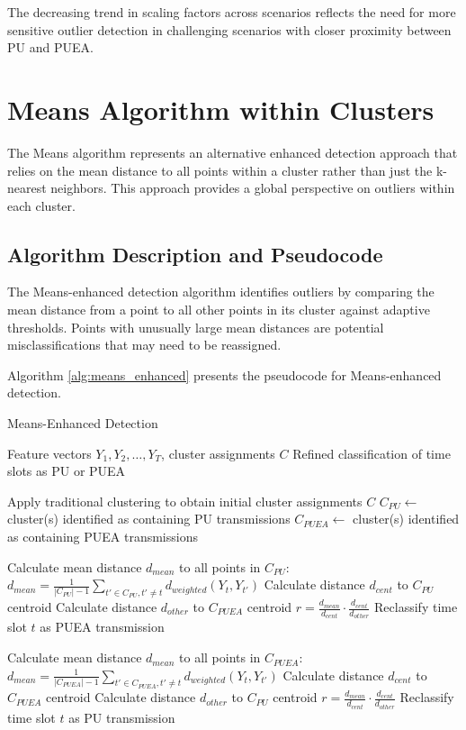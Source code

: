 The decreasing trend in scaling factors across scenarios reflects the need for more sensitive outlier detection in challenging scenarios with closer proximity between PU and PUEA.

\section{Means Algorithm within Clusters}

The Means algorithm represents an alternative enhanced detection approach that relies on the mean distance to all points within a cluster rather than just the k-nearest neighbors. This approach provides a global perspective on outliers within each cluster.

\subsection{Algorithm Description and Pseudocode}

The Means-enhanced detection algorithm identifies outliers by comparing the mean distance from a point to all other points in its cluster against adaptive thresholds. Points with unusually large mean distances are potential misclassifications that may need to be reassigned.

Algorithm \ref{alg:means_enhanced} presents the pseudocode for Means-enhanced detection.

\begin{algorithm}
\caption{Means-Enhanced Detection}
\label{alg:means_enhanced}
\begin{algorithmic}[1]
\Require Feature vectors $Y_1, Y_2, \ldots, Y_T$, cluster assignments $C$
\Ensure Refined classification of time slots as PU or PUEA

\State Apply traditional clustering to obtain initial cluster assignments $C$
\State $C_{PU} \gets$ cluster(s) identified as containing PU transmissions
\State $C_{PUEA} \gets$ cluster(s) identified as containing PUEA transmissions

    \State Calculate mean distance $d_{mean}$ to all points in $C_{PU}$:
    \State $d_{mean} = \frac{1}{|C_{PU}|-1} \sum_{t' \in C_{PU}, t' \neq t} d_{weighted}(Y_t, Y_{t'})$
    \State Calculate distance $d_{cent}$ to $C_{PU}$ centroid
    \State Calculate distance $d_{other}$ to $C_{PUEA}$ centroid
    \State $r = \frac{d_{mean}}{d_{cent}} \cdot \frac{d_{cent}}{d_{other}}$
        \State Reclassify time slot $t$ as PUEA transmission
    \EndIf
\EndFor

    \State Calculate mean distance $d_{mean}$ to all points in $C_{PUEA}$:
    \State $d_{mean} = \frac{1}{|C_{PUEA}|-1} \sum_{t' \in C_{PUEA}, t' \neq t} d_{weighted}(Y_t, Y_{t'})$
    \State Calculate distance $d_{cent}$ to $C_{PUEA}$ centroid
    \State Calculate distance $d_{other}$ to $C_{PU}$ centroid
    \State $r = \frac{d_{mean}}{d_{cent}} \cdot \frac{d_{cent}}{d_{other}}$
        \State Reclassify time slot $t$ as PU transmission
    \EndIf
\EndFor

\end{algorithmic}
\end{algorithm}

